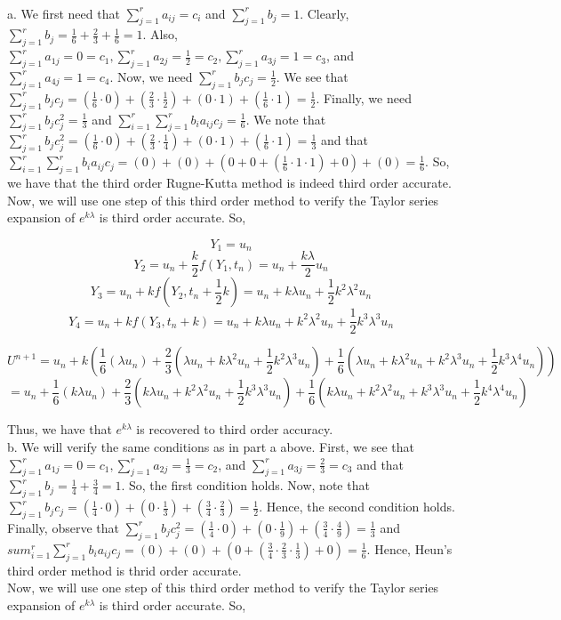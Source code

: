 \begin{solution}\renewcommand{\qedsymbol}{}\ \\
    a. We first need that $\sum_{j=1}^ra_{ij}=c_i$ and $\sum_{j=1}^rb_j=1$. Clearly,
    $\sum_{j=1}^rb_j=\frac16+\frac23+\frac16=1$. Also, $\sum_{j=1}^ra_{1j}=0=c_1, 
    \sum_{j=1}^ra_{2j}=\frac12=c_2, \sum_{j=1}^ra_{3j}=1=c_3$, and $\sum_{j=1}^ra_{4j}=1=c_4$. Now, we
    need $\sum_{j=1}^rb_jc_j=\frac12$. We see that $\sum_{j=1}^rb_jc_j=
    (\frac16\cdot0)+(\frac23\cdot\frac12)+(0\cdot1)+(\frac16\cdot1)=\frac12$. Finally, we need 
    $\sum_{j=1}^rb_jc_j^2=\frac13$ and $\sum_{i=1}^r\sum_{j=1}^rb_ia_{ij}c_j=\frac16$. We note that 
    $\sum_{j=1}^rb_jc_j^2=(\frac16\cdot0)+(\frac23\cdot\frac14)+(0\cdot1)+(\frac16\cdot1)=\frac13$ and
    that $\sum_{i=1}^r\sum_{j=1}^rb_ia_{ij}c_j=(0)+(0)+(0+0+(\frac16\cdot1\cdot1)+0)+(0)=\frac16$. So,
    we have that the third order Rugne-Kutta method is indeed third order accurate.\\
    Now, we will use one step of this third order method to verify the Taylor series expansion of
    $e^{k\lambda}$ is third order accurate. So,

    $$Y_1=u_n$$
    $$Y_2=u_n+\frac{k}{2}f(Y_1,t_n)=u_n+\frac{k\lambda}{2}u_n$$
    $$Y_3=u_n+kf(Y_2,t_n+\frac12k)=u_n+k\lambda u_n+\frac12k^2\lambda^2u_n$$
    $$Y_4=u_n+kf(Y_3,t_n+k)=u_n+k\lambda u_n+k^2\lambda^2u_n+\frac12k^3\lambda^3u_n$$

    $$U^{n+1}=u_n+k(\frac16(\lambda u_n)+\frac23(\lambda u_n+k\lambda^2u_n+\frac12k^2\lambda^3u_n)+
    \frac16(\lambda u_n+k\lambda^2u_n+k^2\lambda^3u_n+\frac12k^3\lambda^4u_n))$$
    $$=u_n+\frac16(k\lambda u_n)+\frac23(k\lambda u_n+k^2\lambda^2u_n+\frac12k^3\lambda^3u_n)+
    \frac16(k\lambda u_n+k^2\lambda^2u_n+k^3\lambda^3u_n+\frac12k^4\lambda^4u_n)$$

    Thus, we have that $e^{k\lambda}$ is recovered to third order accuracy.\\

    b. We will verify the same conditions as in part a above. First, we see that
    $\sum_{j=1}^ra_{1j}=0=c_1, \sum_{j=1}^ra_{2j}=\frac13=c_2$, and $\sum_{j=1}^ra_{3j}=\frac23=c_3$ and
    that $\sum_{j=1}^rb_j=\frac14+\frac34=1$. So, the first condition holds. Now, note that 
    $\sum_{j=1}^rb_jc_j=(\frac14\cdot0)+(0\cdot\frac13)+(\frac34\cdot\frac23)=\frac12$. Hence, the
    second condition holds. Finally, observe that
    $\sum_{j=1}^rb_jc_j^2=(\frac14\cdot0)+(0\cdot\frac19)+(\frac34\cdot\frac49)=\frac13$ and
    $sum_{i=1}^r\sum_{j=1}^rb_ia_{ij}c_j=(0)+(0)+(0+(\frac34\cdot\frac23\cdot\frac13)+0)=\frac16$.
    Hence, Heun's third order method is thrid order accurate.\\
    Now, we will use one step of this third order method to verify the Taylor series expansion of
    $e^{k\lambda}$ is third order accurate. So,


\end{solution}
